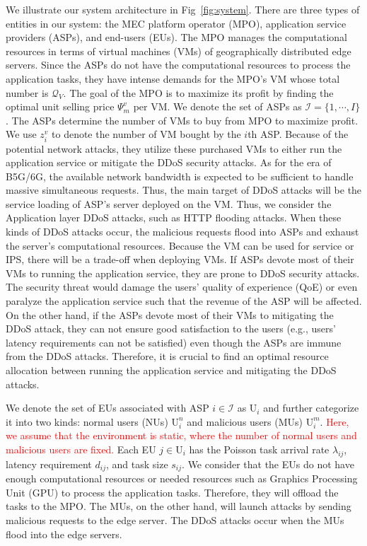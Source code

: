 \documentclass[10pt,journal, compsoc]{IEEEtran}
\begin{document}
We illustrate our system architecture in Fig~\ref{fig:system}. There are three types of entities in our system: the MEC platform operator (MPO), application service providers (ASPs), and end-users (EUs). The MPO manages the computational resources in terms of virtual machines (VMs) of geographically distributed edge servers. Since the ASPs do not have the computational resources to process the application tasks, they have intense demands for the MPO's VM whose total number is $\mathcal{Q}_{V}$. The goal of the MPO is to maximize its profit by finding the optimal unit selling price $\Psi_{m}^v$ per VM. We denote the set of ASPs as $\mathcal{I}=\{1, \cdots, I\}$. The ASPs determine the number of VMs to buy from MPO to maximize profit. We use $z_i^v$ to denote the number of VM bought by the $i$th ASP. Because of the potential network attacks, they utilize these purchased VMs to either run the application service or mitigate the DDoS security attacks. As for the era of B5G/6G, the available network bandwidth is expected to be sufficient to handle massive simultaneous requests. Thus, the main target of DDoS attacks will be the service loading of ASP's server deployed on the VM. Thus, we consider the Application layer DDoS attacks, such as HTTP flooding attacks. When these kinds of DDoS attacks occur, the malicious requests flood into ASPs and exhaust the server's computational resources. Because the VM can be used for service or IPS, there will be a trade-off when deploying VMs. If ASPs devote most of their VMs to running the application service, they are prone to DDoS security attacks. The security threat would damage the users' quality of experience (QoE) or even paralyze the application service such that the revenue of the ASP will be affected. On the other hand, if the ASPs devote most of their VMs to mitigating the DDoS attack, they can not ensure good satisfaction to the users (e.g., users' latency requirements can not be satisfied) even though the ASPs are immune from the DDoS attacks. Therefore, it is crucial to find an optimal resource allocation between running the application service and mitigating the DDoS attacks.

We denote the set of EUs associated with ASP $i \in \mathcal{I}$ as $\mathrm{U}_i$ and further categorize it into two kinds: normal users (NUs) $\mathrm{U}_i^n$ and malicious users (MUs) $\mathrm{U}_i^m$. \textcolor{red}{Here, we assume that the environment is static, where the number of normal users and malicious users are fixed.} Each EU $j \in \mathrm{U}_i$ has the Poisson task arrival rate $\lambda_{ij}$, latency requirement $d_{ij}$, and task size $s_{ij}$. We consider that the EUs do not have enough computational resources or needed resources such as Graphics Processing Unit (GPU) to process the application tasks. Therefore, they will offload the tasks to the MPO. The MUs, on the other hand, will launch attacks by sending malicious requests to the edge server. The DDoS attacks occur when the MUs flood into the edge servers. 
\end{document}
